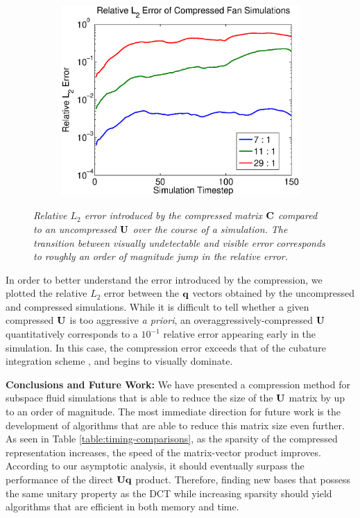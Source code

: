 \begin{figure}
  \begin{subfigure}[b]{0.3\textwidth}
    \includegraphics[width=\textwidth]{chap4/figures/fanError}
    \label{fig:fanError}
  \end{subfigure}
 \caption{\em Relative $L_2$ error introduced by the compressed  matrix $\mathbf{C}$ compared to an uncompressed $\mathbf{U}$ over the course of a simulation. The transition between visually undetectable and visible error corresponds to roughly an order of magnitude jump in the relative error.}
\end{figure}

In order to better understand the error introduced by the compression, we plotted the relative $L_2$ error between the $\mathbf{q}$ vectors obtained by the uncompressed and compressed simulations. While it is difficult to tell whether a given compressed $\mathbf{U}$ is too aggressive {\em a priori}, an overaggressively-compressed $\mathbf{U}$ quantitatively corresponds to a $10^{-1}$ relative error appearing early in the simulation. In this case, the compression error exceeds that of the cubature integration scheme \cite{Kim2013}, and begins to visually dominate.

\noindent \textbf{Conclusions and Future Work:} We have presented a compression method for subspace fluid simulations that is able to reduce the size of the $\mathbf{U}$ matrix by up to an order of magnitude. The most immediate direction for future work is the development of algorithms that are able to reduce this matrix size even further. As seen in Table \ref{table:timing-comparisons}, as the sparsity of the compressed representation increases, the speed of the matrix-vector product improves. According to our asymptotic analysis, it should eventually surpass the performance of the direct $\mathbf{U}\mathbf{q}$ product. Therefore, finding new bases that possess the same unitary property as the DCT while increasing sparsity should yield algorithms that are efficient in both memory and time.

